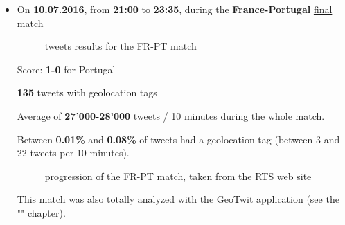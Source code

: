 \documentclass[a4paper,11pt]{report}
\begin{document}
\begin{itemize}
	\item On \textbf{10.07.2016}, from \textbf{21:00} to \textbf{23:35}, during the \textbf{France-Portugal} \underline{final} match
	\begin{figure}[H]
	\vspace{-5pt}
	\begin{center}
	\vspace{-5pt}
	\caption{tweets results for the FR-PT match}
	\end{center}
	\end{figure}
	\vspace{-20pt}
	Score: \textbf{1-0} for Portugal
	
	\textbf{135} tweets with geolocation tags
	
	Average of \textbf{27'000-28'000} tweets / 10 minutes during the whole match.
	
	Between \textbf{0.01\%} and \textbf{0.08\%} of tweets had a geolocation tag (between 3 and 22 tweets per 10 minutes).\\
	\begin{figure}[H]
	\vspace{-5pt}
	\begin{center}
	\vspace{-5pt}
	\caption{progression of the FR-PT match, taken from the RTS web site}
	\end{center}
	\end{figure}
	\vspace{-10pt}
	This match was also totally analyzed with the GeoTwit application (see the "" chapter).
\end{itemize}
\bigskip
\end{document}
